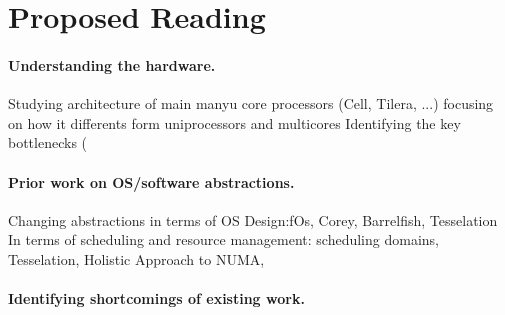 \section{Proposed Reading}
\label{sec:reading}

\paragraph{Understanding the hardware.}
Studying architecture of main manyu core processors
(Cell, Tilera, ...) focusing on how it differents
form uniprocessors and multicores
Identifying the key bottlenecks (
\paragraph{Prior work on OS/software abstractions.}

Changing abstractions in terms of OS Design:fOs, Corey, Barrelfish, Tesselation
In terms of scheduling and resource management: scheduling domains, Tesselation, Holistic Approach to NUMA, 
\paragraph{Identifying shortcomings of existing work.}
